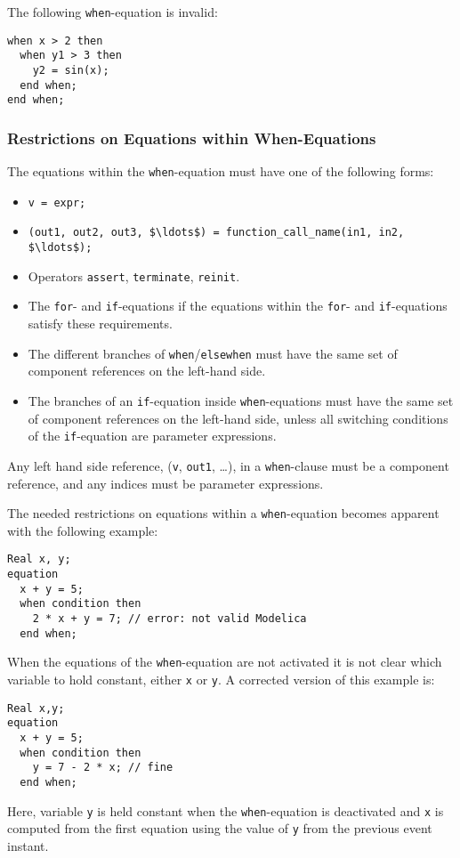 \begin{example}
The following \lstinline!when!-equation is invalid:
\begin{lstlisting}[language=modelica]
when x > 2 then
  when y1 > 3 then
    y2 = sin(x);
  end when;
end when;
\end{lstlisting}
\end{example}

\subsubsection{Restrictions on Equations within When-Equations}\label{restrictions-on-equations-within-when-equations}

The equations within the \lstinline!when!-equation must have one of the following forms:
\begin{itemize}
\item
  \lstinline!v = expr;!
\item
  \lstinline!(out1, out2, out3, $\ldots$) = function_call_name(in1, in2, $\ldots$);!
\item
  Operators \lstinline!assert!, \lstinline!terminate!, \lstinline!reinit!.
\item
  The \lstinline!for!- and \lstinline!if!-equations if the equations within the \lstinline!for!- and \lstinline!if!-equations satisfy these requirements.
\item
  The different branches of \lstinline!when!/\lstinline!elsewhen! must have the same set of component references on the left-hand side.
\item
  The branches of an \lstinline!if!-equation inside \lstinline!when!-equations must have the same set of component references on the left-hand side, unless all switching conditions of the \lstinline!if!-equation are parameter expressions.
\end{itemize}

Any left hand side reference, (\lstinline!v!, \lstinline!out1!, \ldots), in a \lstinline!when!-clause must be a component reference, and any indices must be parameter expressions.

\begin{nonnormative}
The needed restrictions on equations within a \lstinline!when!-equation becomes apparent with the following example:
\begin{lstlisting}[language=modelica]
  Real x, y;
equation
  x + y = 5;
  when condition then
    2 * x + y = 7; // error: not valid Modelica
  end when;
\end{lstlisting}

When the equations of the \lstinline!when!-equation are not activated it is not clear which variable to hold constant, either \lstinline!x! or \lstinline!y!.
A corrected version of this example is:
\begin{lstlisting}[language=modelica]
  Real x,y;
equation
  x + y = 5;
  when condition then
    y = 7 - 2 * x; // fine
  end when;
\end{lstlisting}
Here, variable \lstinline!y! is held constant when the \lstinline!when!-equation is deactivated and \lstinline!x! is computed from the first equation using the value of \lstinline!y! from the previous event instant.
\end{nonnormative}


